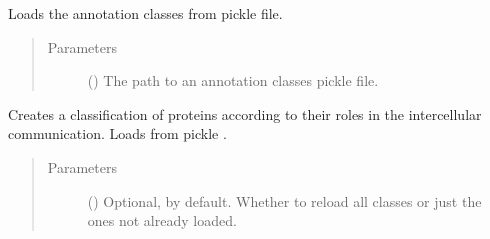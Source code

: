 \documentclass[letterpaper,10pt,english]{sphinxmanual}
\begin{document}
\begin{fulllineitems}
\begin{fulllineitems}
\begin{quote}
\begin{description}
\end{description}\end{quote}

\end{fulllineitems}


\begin{fulllineitems}
\label{\detokenize{reference:pypath.annot.CustomAnnotation.load_from_pickle}}
Loads the annotation classes from pickle file.
\begin{quote}\begin{description}
\item[{Parameters}] \leavevmode
{} () \textendash{} The path to an annotation classes pickle file.

\end{description}\end{quote}

\end{fulllineitems}


\begin{fulllineitems}
\label{\detokenize{reference:pypath.annot.CustomAnnotation.make_df}}
\end{fulllineitems}


\begin{fulllineitems}
\label{\detokenize{reference:pypath.annot.CustomAnnotation.populate_classes}}
Creates a classification of proteins according to their roles
in the intercellular communication. Loads from pickle
.
\begin{quote}\begin{description}
\item[{Parameters}] \leavevmode
{} () \textendash{} Optional,  by default. Whether to reload all
classes or just the ones not already loaded.


\end{description}
\end{quote}
\end{fulllineitems}
\end{fulllineitems}
\end{document}
